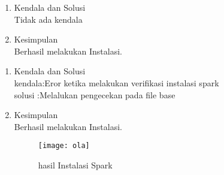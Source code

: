

\begin{enumerate}
\item Kendala dan Solusi\\
Tidak ada kendala

\item Kesimpulan\\
Berhasil melakukan Instalasi.

\end{enumerate}

\begin{enumerate}
\item Kendala dan Solusi\\
 kendala:Eror ketika melakukan verifikasi instalasi spark\\
 solusi :Melalukan pengecekan pada file base

\item Kesimpulan
\\ Berhasil melakukan Instalasi.
\begin{figure}[!ht]
\texttt{[image: ola]}
\caption{hasil Instalasi Spark}
\label{gam:Hasil}
\end{figure}
\end{enumerate}

